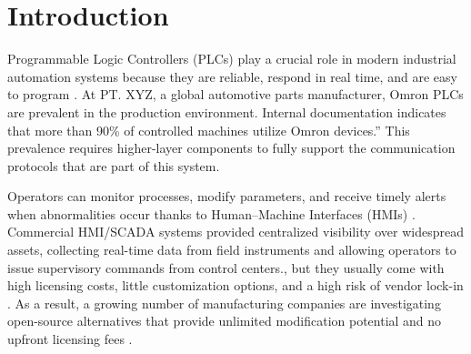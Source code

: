 \section{Introduction}

Programmable Logic Controllers (PLCs) play a crucial role in modern industrial automation systems because they are reliable, respond in real time, and are easy to program \cite{koondhar2023role}. At PT. XYZ, a global automotive parts manufacturer, Omron PLCs are prevalent in the production environment. Internal documentation indicates that more than 90\% of controlled machines utilize Omron devices.” This prevalence requires higher-layer components to fully support the communication protocols that are part of this system.

Operators can monitor processes, modify parameters, and receive timely alerts when abnormalities occur thanks to Human–Machine Interfaces (HMIs) \cite{mujawar2023_hmi_intro}. Commercial HMI/SCADA systems provided centralized visibility over widespread assets, collecting real-time data from field instruments and allowing operators to issue supervisory commands from control centers.\cite{enemosah2022next}, but they usually come with high licensing costs, little customization options, and a high risk of vendor lock-in \cite{malyi2024unified, 10.2523/IPTC-24344-MS}. As a result, a growing number of manufacturing companies are investigating open-source alternatives that provide unlimited modification potential and no upfront licensing fees \cite{mckinsey2023automation}.

